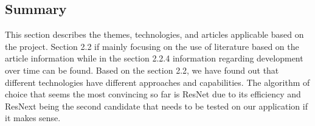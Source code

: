 \subsection{Summary}
This section describes the themes, technologies, and articles applicable based on the project. Section 2.2 if mainly focusing on the use of literature based on the article information while in the section 2.2.4 information regarding development over time can be found.
\newline
Based on the section 2.2, we have found out that different technologies have different approaches and capabilities. The algorithm of choice that seems the most convincing so far is ResNet due to its efficiency and ResNext being the second candidate that needs to be tested on our application if it makes sense.